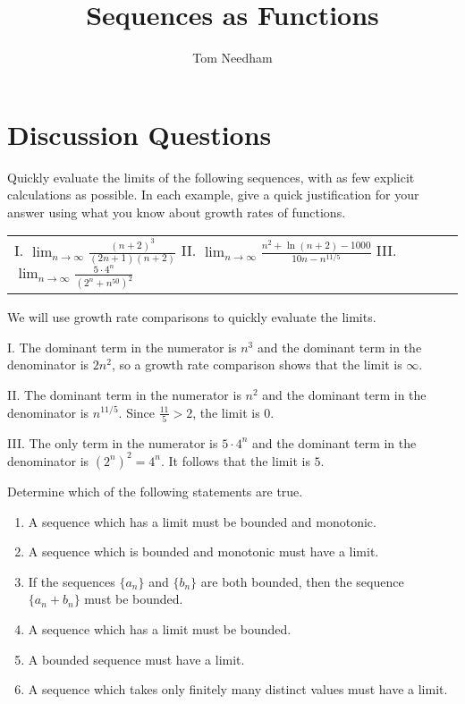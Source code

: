 \documentclass[]{ximera}
\author{Tom Needham}
\title[]{Sequences as Functions}
\begin{document}
\begin{abstract}
\end{abstract}
\maketitle

\vspace{-0.4in}

\section{Discussion Questions}

\begin{problem}
Quickly evaluate the limits of the following sequences, with as few explicit calculations as possible. In each example, give a quick justification for your answer using what you know about growth rates of functions.
\begin{center}
\begin{tabular}{lll}
I. $\lim_{n \rightarrow \infty} \frac{(n+2)^3}{(2n+1)(n+2)}$ \hspace{.1in} II. $\lim_{n \rightarrow \infty} \frac{n^2 + \ln(n+2)-1000}{10n - n^{11/5}}$ \hspace{.1in} III. $\lim_{n\rightarrow \infty} \frac{5 \cdot 4^n}{(2^n + n^{50})^2}$
\end{tabular}
\end{center}
\end{problem}

\begin{freeResponse}
We will use growth rate comparisons to quickly evaluate the limits.

I. The dominant term in the numerator is $n^3$ and the dominant term in the denominator is $2n^2$, so a growth rate comparison shows that the limit is $\infty$.

II. The dominant term in the numerator is $n^2$ and the dominant term in the denominator is $n^{11/5}$. Since $\frac{11}{5} > 2$, the limit is $0$. 

III. The only term in the numerator is $5 \cdot 4^n$ and the dominant term in the denominator is $(2^n)^2 = 4^n$. It follows that the limit is $5$. 
\end{freeResponse}

\begin{problem}
Determine which of the following statements are true.
\begin{enumerate}[label=(\alph*)]
\item A sequence which has a limit must be bounded and monotonic.
\item A sequence which is bounded and monotonic must have a limit.
\item If the sequences $\{a_n\}$ and $\{b_n\}$ are both bounded, then the sequence $\{a_n + b_n\}$ must be bounded.
\item A sequence which has a limit must be bounded.
\item A bounded sequence must have a limit.
\item A sequence which takes only finitely many distinct values must have a limit.
\end{enumerate}
\end{problem}
\end{document}
